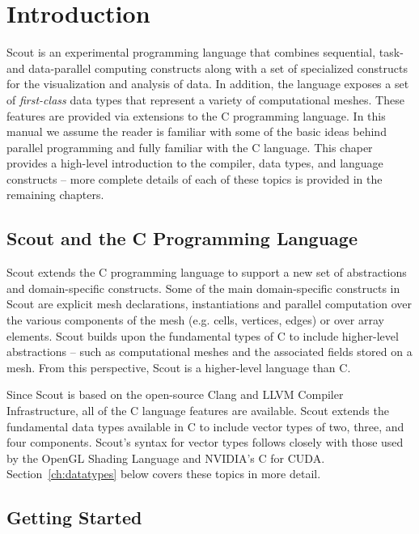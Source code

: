 \let\clearforchapter\par %

\chapter{Introduction}

Scout is an experimental programming language that combines
sequential, task- and data-parallel computing constructs along with a
set of specialized constructs for the visualization and analysis of
data. In addition, the language exposes a set of \emph{first-class}
data types that represent a variety of computational meshes.  These
features are provided via extensions to the C programming language.
In this manual we assume the reader is familiar with some of the basic
ideas behind parallel programming and fully familiar with the C
language.  This chaper provides a high-level introduction to the
compiler, data types, and language constructs -- more complete details
of each of these topics is provided in the remaining chapters.

\section{Scout and the C Programming Language}
\label{ch1:scout-clang}

Scout extends the C programming language to support a new set of
abstractions and domain-specific constructs.  Some of the main
domain-specific constructs in Scout are explicit mesh declarations,
instantiations and parallel computation over the various components of
the mesh (e.g. cells, vertices, edges) or over array elements.  Scout
builds upon the fundamental types of C to include higher-level
abstractions -- such as computational meshes and the associated fields
stored on a mesh.  From this perspective, Scout is a higher-level
language than C.

Since Scout is based on the open-source Clang and LLVM Compiler Infrastructure, all of 
the C language features are available. 
Scout extends the fundamental data types
available in C to include vector types of two, three, and four components.  Scout's 
syntax for vector types follows closely with those used by the OpenGL Shading Language
and NVIDIA's C for CUDA.  Section~\ref{ch:datatypes} below covers these topics in more 
detail.

\section{Getting Started}
\label{ch1:started}

